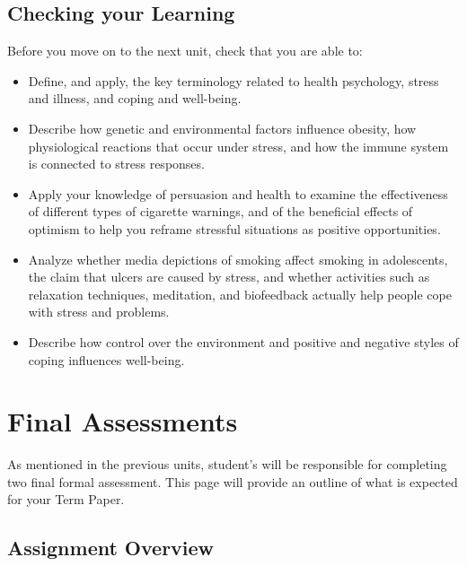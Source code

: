 \documentclass[
]{book}
\begin{document}
\hypertarget{checking-your-learning-11}{%
\section*{Checking your Learning}\label{checking-your-learning-11}}

\begin{progress}
Before you move on to the next unit, check that you are able to:

\begin{itemize}
\item
  Define, and apply, the key terminology related to health psychology, stress and illness, and coping and well-being.
\item
  Describe how genetic and environmental factors influence obesity, how physiological reactions that occur under stress, and how the immune system is connected to stress responses.
\item
  Apply your knowledge of persuasion and health to examine the effectiveness of different types of cigarette warnings, and of the beneficial effects of optimism to help you reframe stressful situations as positive opportunities.
\item
  Analyze whether media depictions of smoking affect smoking in adolescents, the claim that ulcers are caused by stress, and whether activities such as relaxation techniques, meditation, and biofeedback actually help people cope with stress and problems.
\item
  Describe how control over the environment and positive and negative styles of coping influences well-being.
\end{itemize}
\end{progress}

\hypertarget{final-assessments}{%
\chapter{Final Assessments}\label{final-assessments}}

As mentioned in the previous units, student's will be responsible for completing two final formal assessment. This page will provide an outline of what is expected for your Term Paper.

\hypertarget{assignment-overview}{%
\section*{Assignment Overview}\label{assignment-overview}}
\end{document}
